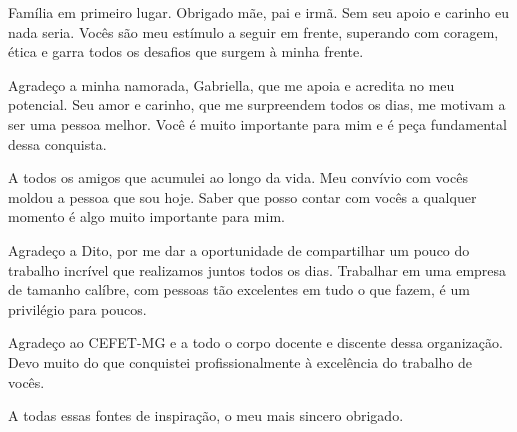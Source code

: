 
\begin{agradecimentos}

Família em primeiro lugar. Obrigado mãe, pai e irmã. Sem seu apoio e carinho eu nada seria. Vocês são meu estímulo a seguir em frente, superando com coragem, ética e garra todos os desafios que surgem à minha frente.

Agradeço a minha namorada, Gabriella, que me apoia e acredita no meu potencial. Seu amor e carinho, que me surpreendem todos os dias, me motivam a ser uma pessoa melhor. Você é muito importante para mim e é peça fundamental dessa conquista.

A todos os amigos que acumulei ao longo da vida. Meu convívio com vocês moldou a pessoa que sou hoje. Saber que posso contar com vocês a qualquer momento é algo muito importante para mim.

Agradeço a Dito, por me dar a oportunidade de compartilhar um pouco do trabalho incrível que realizamos juntos todos os dias. Trabalhar em uma empresa de tamanho calíbre, com pessoas tão excelentes em tudo o que fazem, é um privilégio para poucos.

Agradeço ao CEFET-MG e a todo o corpo docente e discente dessa organização. Devo muito do que conquistei profissionalmente à excelência do trabalho de vocês.

A todas essas fontes de inspiração, o meu mais sincero obrigado.

\end{agradecimentos}

